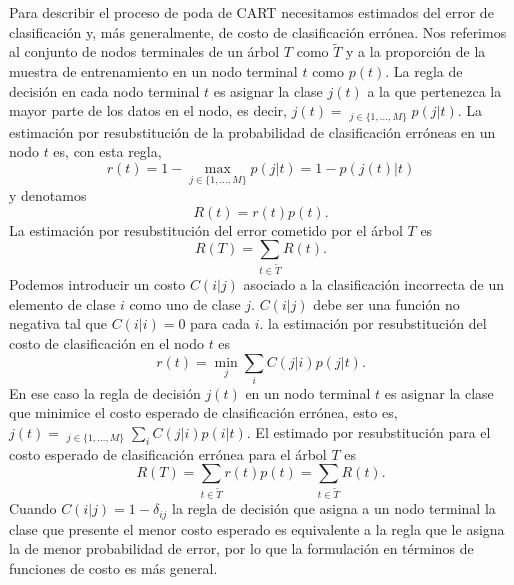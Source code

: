 \documentclass[letterpaper,12pt]{book}
\DeclareMathOperator*{\argmax}{arg\,m\acute{a}x}
\DeclareMathOperator*{\argmin}{arg\,m\acute{i}n}
\begin{document}
Para describir el proceso de poda de CART necesitamos estimados del error de clasificación y, más generalmente, de costo de clasificación errónea. Nos referimos al conjunto de nodos terminales de un árbol $T$ como $\widetilde{T}$ y a la proporción de la muestra de entrenamiento en un nodo terminal $t$ como $p(t)$. La regla de decisión en cada nodo terminal $t$ es asignar la clase $j(t)$ a la que pertenezca la mayor parte de los datos en el nodo, es decir, $j(t) = \argmax_{j\in\{1,\dots,M\}}p(j|t)$. La estimación por resubstitución de la probabilidad de clasificación erróneas en un nodo $t$ es, con esta regla,
\begin{equation}
r(t)=1-\max_{j\in\{1,\dots,M\}}p(j|t) = 1-p(j(t)|t)
\end{equation}
y denotamos 
\begin{equation}
R(t) = r(t)p(t).
\end{equation}
La estimación por resubstitución del error cometido por el árbol $T$ es 
\begin{equation}
R(T) = \sum_{t\in\tilde{T}}R(t).
\end{equation} 
Podemos introducir un costo $C(i|j)$ asociado a la clasificación incorrecta de un elemento de clase $i$ como uno de clase $j$. $C(i|j)$ debe ser una función no negativa tal que $C(i|i) = 0$ para cada $i$. la  estimación por resubstitución del costo de clasificación en el nodo $t$ es 
\begin{equation}
r(t) = \min_j\sum_iC(j|i)p(j|t).
\end{equation}
En ese caso la regla de decisión $j(t)$ en un nodo terminal $t$ es asignar la clase que minimice el costo esperado de clasificación errónea, esto es, $j(t) = \argmin_{j\in\{1,\dots,M\}}\sum_iC(j|i)p(i|t)$. El estimado por resubstitución para el costo esperado de clasificación errónea para el árbol $T$ es
\begin{equation}
R(T) = \sum_{t\in\tilde{T}}r(t)p(t)=\sum_{t\in\tilde{T}}R(t).
\end{equation}
Cuando $C(i|j) = 1-\delta_{ij}$ la regla de decisión que asigna a un nodo terminal la clase que presente el menor costo esperado es equivalente a la regla que le asigna la de menor probabilidad de error, por lo que la formulación en términos de funciones de costo es más general.
\end{document}
